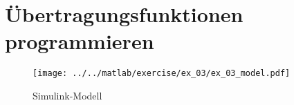 \section{Übertragungsfunktionen programmieren}
\begin{figure}[h!]
	\centering
	\texttt{[image: ../../matlab/exercise/ex\_03/ex\_03\_model.pdf]}
	\caption{Simulink-Modell}
\end{figure}
